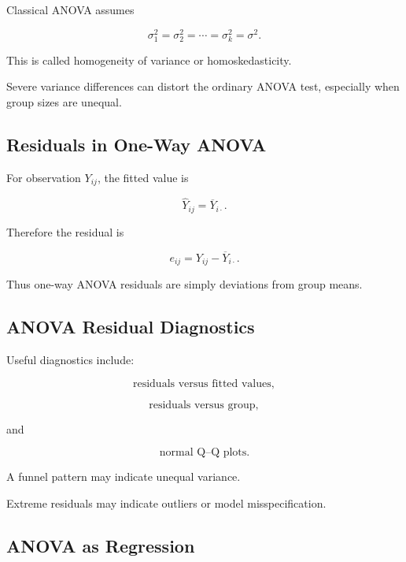 Classical ANOVA assumes

\[
\boxed{
\sigma_1^2
=
\sigma_2^2
=
\cdots
=
\sigma_k^2
=
\sigma^2.
}
\]

This is called homogeneity of variance or homoskedasticity.

Severe variance differences can distort the ordinary ANOVA test,
especially when group sizes are unequal.

\subsection{Residuals in One-Way ANOVA}
\label{subsec:anova-residuals}

For observation \(Y_{ij}\), the fitted value is

\[
\boxed{
\widehat{Y}_{ij}
=
\overline{Y}_{i\cdot}.
}
\]

Therefore the residual is

\[
\boxed{
e_{ij}
=
Y_{ij}
-
\overline{Y}_{i\cdot}.
}
\]

Thus one-way ANOVA residuals are simply deviations from group means.

\subsection{ANOVA Residual Diagnostics}
\label{subsec:anova-residual-diagnostics}

Useful diagnostics include:

\[
\boxed{
\text{residuals versus fitted values},
}
\]

\[
\boxed{
\text{residuals versus group},
}
\]

and

\[
\boxed{
\text{normal Q--Q plots}.
}
\]

A funnel pattern may indicate unequal variance.

Extreme residuals may indicate outliers or model misspecification.

\subsection{ANOVA as Regression}
\label{subsec:anova-as-regression}

